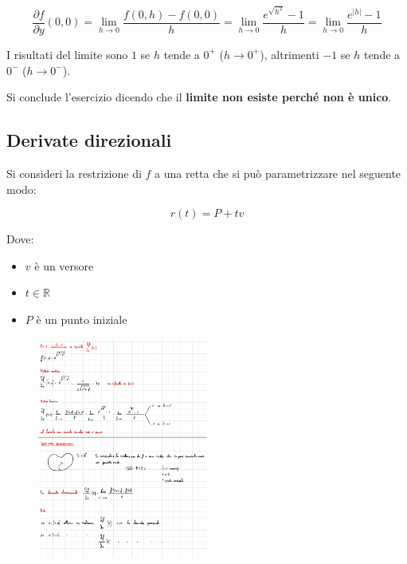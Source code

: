 \documentclass[a4paper]{article}
\begin{document}
	\begin{equation*}
		\dfrac{\partial f}{\partial y}\left(0,0\right) = \lim_{h \rightarrow 0} \dfrac{f\left(0,h\right) - f\left(0,0\right)}{h} = \lim_{h \rightarrow 0} \dfrac{e^{\sqrt{h^{2}}} - 1}{h} = \lim_{h \rightarrow 0} \dfrac{e^{|h|} - 1}{h}
	\end{equation*}

	\noindent
	I risultati del limite sono $1$ se $h$ tende a $0^{+}$ ($h \rightarrow 0^{+}$), altrimenti $-1$ se $h$ tende a $0^{-}$ ($h \rightarrow 0^{-}$).\newline

	\noindent
	Si conclude l'esercizio dicendo che il \textbf{limite non esiste perché non è unico}.
	
	\newpage
	
	\subsection{Derivate direzionali}
	
	Si consideri la restrizione di $f$ a una retta che si può parametrizzare nel seguente modo:
	
	\begin{equation*}
		r\left(t\right) = P + tv
	\end{equation*}

	\noindent
	Dove:
	
	\begin{itemize}[label=-]
		\item $v$ è un versore
		\item $t \in \mathbb{R}$
		\item $P$ è un punto iniziale
	\end{itemize}

	\begin{figure}[!htp]
		\centering
		\includegraphics[width=0.5\textwidth]{img/derivate_direzionali.pdf}
	\end{figure}
\end{document}
